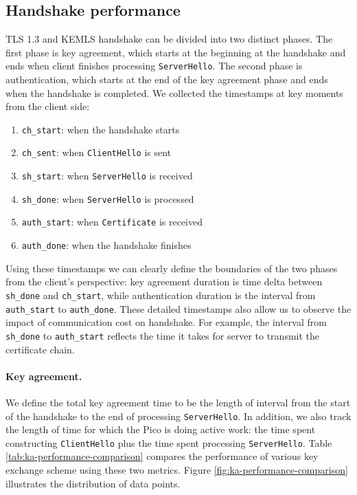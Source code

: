 \documentclass[letterpaper,12pt,titlepage,oneside,final]{book}
\begin{document}
\subsection{Handshake performance}
TLS 1.3 and KEMLS handshake can be divided into two distinct phases.
The first phase is key agreement, which starts at the beginning at the handshake and ends when client finishes processing \texttt{ServerHello}.
The second phase is authentication, which starts at the end of the key agreement phase and ends when the handshake is completed.
We collected the timestamps at key moments from the client side: \begin{enumerate}
    \item \texttt{ch\_start}: when the handshake starts
    \item \texttt{ch\_sent}: when \texttt{ClientHello} is sent
    \item \texttt{sh\_start}: when \texttt{ServerHello} is received
    \item \texttt{sh\_done}: when \texttt{ServerHello} is processed
    \item \texttt{auth\_start}: when \texttt{Certificate} is received
    \item \texttt{auth\_done}: when the handshake finishes
\end{enumerate}

Using these timestamps we can clearly define the boundaries of the two phases from the client's perspective: key agreement duration is time delta between \texttt{sh\_done} and \texttt{ch\_start}, while authentication duration is the interval from \texttt{auth\_start} to \texttt{auth\_done}.
These detailed timestamps also allow us to observe the impact of communication cost on handshake.
For example, the interval from \texttt{sh\_done} to \texttt{auth\_start} reflects the time it takes for server to transmit the certificate chain.

\paragraph{Key agreement.}
We define the total key agreement time to be the length of interval from the start of the handshake to the end of processing \texttt{ServerHello}. 
In addition, we also track the length of time for which the Pico is doing active work: the time spent constructing \texttt{ClientHello} plus the time spent processing \texttt{ServerHello}.
Table \ref{tab:ka-performance-comparison} compares the performance of various key exchange scheme using these two metrics. 
Figure \ref{fig:ka-performance-comparison} illustrates the distribution of data points.
\end{document}
